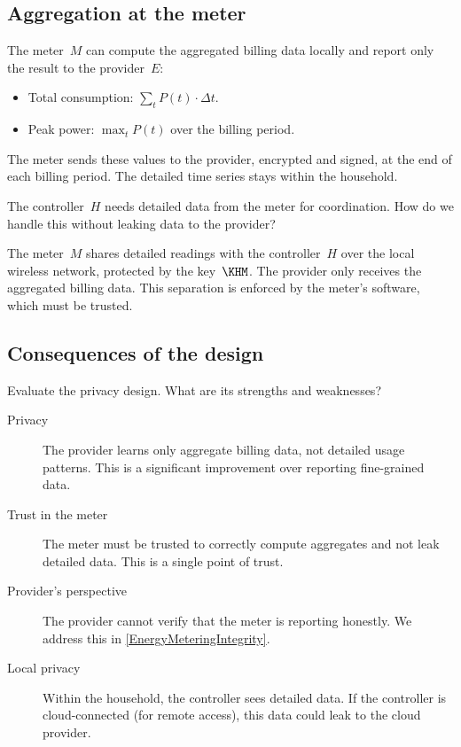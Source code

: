 \subsection{Aggregation at the meter}

The meter~\(M\) can compute the aggregated billing data locally and report
only the result to the provider~\(E\):
\begin{itemize}
  \item Total consumption: \(\sum_{t} P(t) \cdot \Delta t\).
  \item Peak power: \(\max_{t} P(t)\) over the billing period.
\end{itemize}

The meter sends these values to the provider, encrypted and signed, at the
end of each billing period.
The detailed time series stays within the household.

\begin{exercise}
  The controller~\(H\) needs detailed data from the meter for coordination.
  How do we handle this without leaking data to the provider?
\end{exercise}

The meter~\(M\) shares detailed readings with the controller~\(H\) over the
local wireless network, protected by the key~\(\KHM\).
The provider only receives the aggregated billing data.
This separation is enforced by the meter's software, which must be trusted.

\subsection{Consequences of the design}

\begin{exercise}
  Evaluate the privacy design.
  What are its strengths and weaknesses?
\end{exercise}

\begin{description}
  \item[Privacy] The provider learns only aggregate billing data, not
    detailed usage patterns.
    This is a significant improvement over reporting fine-grained data.
  \item[Trust in the meter] The meter must be trusted to correctly compute
    aggregates and not leak detailed data.
    This is a single point of trust.
  \item[Provider's perspective] The provider cannot verify that the meter
    is reporting honestly.
    We address this in \cref{EnergyMeteringIntegrity}.
  \item[Local privacy] Within the household, the controller sees detailed
    data.
    If the controller is cloud-connected (\eg for remote access), this
    data could leak to the cloud provider.
\end{description}


